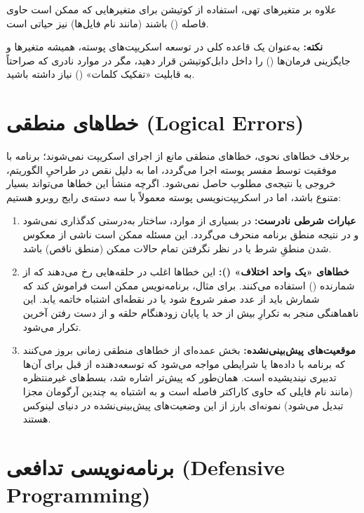 علاوه بر متغیرهای تهی، استفاده از کوتیشن برای متغیرهایی که ممکن است حاوی فاصله () باشند (مانند نام فایل‌ها) نیز حیاتی است.

\begin{note}
\textbf{نکته:} به‌عنوان یک قاعده کلی در توسعه اسکریپت‌های پوسته، همیشه متغیرها و جایگزینی فرمان‌ها () را داخل دابل‌کوتیشن قرار دهید، مگر در موارد نادری که صراحتاً به قابلیت «تفکیک کلمات» () نیاز داشته باشید.
\end{note}

\section{خطاهای منطقی (Logical Errors)}

برخلاف خطاهای نحوی، خطاهای منطقی مانع از اجرای اسکریپت نمی‌شوند؛ برنامه با موفقیت توسط مفسر پوسته اجرا می‌گردد، اما به دلیل نقص در طراحیِ الگوریتم، خروجی یا نتیجه‌ی مطلوب حاصل نمی‌شود. اگرچه منشأ این خطاها می‌تواند بسیار متنوع باشد، اما در اسکریپت‌نویسی پوسته معمولاً با سه دسته‌ی رایج روبرو هستیم:

\begin{enumerate}
  \item \textbf{عبارات شرطی نادرست:} در بسیاری از موارد، ساختار  به‌درستی کدگذاری نمی‌شود و در نتیجه منطق برنامه منحرف می‌گردد. این مسئله ممکن است ناشی از معکوس شدن منطقِ شرط یا در نظر نگرفتن تمام حالات ممکن (منطق ناقص) باشد.

  \item \textbf{خطاهای «یک واحد اختلاف» ():} این خطاها اغلب در حلقه‌هایی رخ می‌دهند که از شمارنده () استفاده می‌کنند. برای مثال، برنامه‌نویس ممکن است فراموش کند که شمارش باید از عدد صفر شروع شود یا در نقطه‌ای اشتباه خاتمه یابد. این ناهماهنگی منجر به تکرارِ بیش از حد یا پایان زودهنگام حلقه و از دست رفتن آخرین تکرار می‌شود.

  \item \textbf{موقعیت‌های پیش‌بینی‌نشده:} بخش عمده‌ای از خطاهای منطقی زمانی بروز می‌کنند که برنامه با داده‌ها یا شرایطی مواجه می‌شود که توسعه‌دهنده از قبل برای آن‌ها تدبیری نیندیشیده است. همان‌طور که پیش‌تر اشاره شد، بسط‌های غیرمنتظره (مانند نام فایلی که حاوی کاراکتر فاصله است و به اشتباه به چندین آرگومان مجزا تبدیل می‌شود) نمونه‌ای بارز از این وضعیت‌های پیش‌بینی‌نشده در دنیای لینوکس هستند.
\end{enumerate}

\section{برنامه‌نویسی تدافعی (Defensive Programming)}

